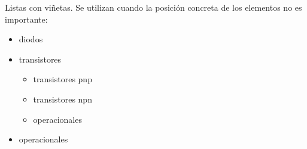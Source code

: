 Listas con viñetas. Se utilizan cuando la posición concreta de los elementos no es importante:

\begin{itemize}
\item diodos
\item transistores
    \begin{itemize}
    \item transistores pnp
    \item transistores npn
    \item operacionales
    \end{itemize}
\item operacionales
\end{itemize}
